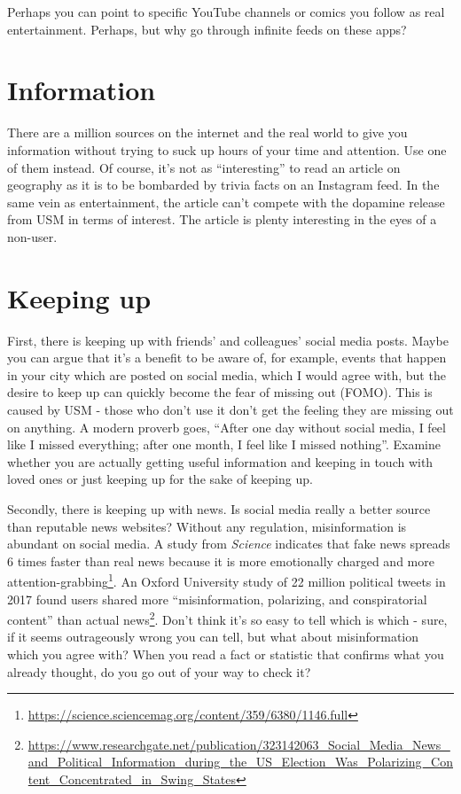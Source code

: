 \documentclass[
]{book}
\begin{document}
Perhaps you can point to specific YouTube channels or comics you follow as real entertainment. Perhaps, but why go through infinite feeds on these apps?

\section{Information}\label{information}

There are a million sources on the internet and the real world to give you information without trying to suck up hours of your time and attention. Use one of them instead. Of course, it's not as ``interesting'' to read an article on geography as it is to be bombarded by trivia facts on an Instagram feed. In the same vein as entertainment, the article can't compete with the dopamine release from USM in terms of interest. The article is plenty interesting in the eyes of a non-user.

\section{Keeping up}\label{keeping-up}

First, there is keeping up with friends' and colleagues' social media posts. Maybe you can argue that it's a benefit to be aware of, for example, events that happen in your city which are posted on social media, which I would agree with, but the desire to keep up can quickly become the fear of missing out (FOMO). This is caused by USM - those who don't use it don't get the feeling they are missing out on anything. A modern proverb goes, ``After one day without social media, I feel like I missed everything; after one month, I feel like I missed nothing''. Examine whether you are actually getting useful information and keeping in touch with loved ones or just keeping up for the sake of keeping up.

Secondly, there is keeping up with news. Is social media really a better source than reputable news websites? Without any regulation, misinformation is abundant on social media. A study from \emph{Science} indicates that fake news spreads 6 times faster than real news because it is more emotionally charged and more attention-grabbing\footnote{\url{https://science.sciencemag.org/content/359/6380/1146.full}}. An Oxford University study of 22 million political tweets in 2017 found users shared more ``misinformation, polarizing, and conspiratorial content'' than actual news\footnote{\url{https://www.researchgate.net/publication/323142063_Social_Media_News_and_Political_Information_during_the_US_Election_Was_Polarizing_Content_Concentrated_in_Swing_States}}. Don't think it's so easy to tell which is which - sure, if it seems outrageously wrong you can tell, but what about misinformation which you agree with? When you read a fact or statistic that confirms what you already thought, do you go out of your way to check it?
\end{document}
